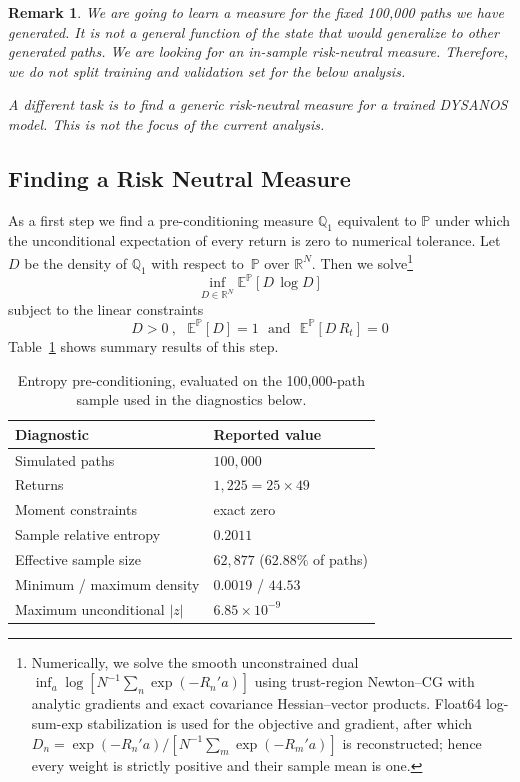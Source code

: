 \documentclass[11pt,a4paper]{article}
\newtheorem{remark}[definition]{Remark}
\newcommand{\R}{\mathbb{R}}
\newcommand{\E}{\mathbb{E}}
\newcommand{\Q}{\mathbb{Q}}
\renewcommand{\P}{\mathbb{P}}
\renewcommand{\Q}{\mathbb{Q}}
\DeclareRobustCommand{\eqlabel}[1]{\label{eq:#1}}                                     %
\DeclareRobustCommand{\eq}[1]{\begin{equation}\eqlabel{#1}}                           %
\DeclareRobustCommand{\eqend}{\end{equation}}                                         %
\begin{document}
\begin{remark}
We are going to learn a measure for the \emph{fixed} 100,000 paths we have generated. It is not a general function of the state that would
generalize to other generated paths. We are looking for an in-sample risk-neutral measure.
Therefore, we do not split training and validation set for the below analysis.

A different task is to find a generic risk-neutral measure for a trained DYSANOS model. This is not the focus of the current analysis.
\end{remark}

\subsection{Finding a Risk Neutral Measure}

As a first step we find a pre-conditioning measure $\Q_1$ equivalent to $\P$ under which the unconditional expectation of every return is zero to numerical tolerance.
Let $D$ be the density of $\Q_1$ with respect to~$\P$ over $\R^N$. Then we solve\footnote{
  Numerically, we solve the smooth unconstrained dual
  $\inf_a\log[N^{-1}\sum_n\exp(-R_n'a)]$ using trust-region Newton--CG with analytic gradients and exact covariance Hessian--vector products.
  Float64 log-sum-exp stabilization is used for the objective and gradient, after which $D_n=\exp(-R_n'a)/[N^{-1}\sum_m\exp(-R_m'a)]$ is reconstructed;
  hence every weight is strictly positive and their sample mean is one.}
\eq{convex}
  \inf_{D\in \R^N} \E^\P\left[ D\, \log D \right]
\eqend
subject to the linear constraints
\eq{convexcond}
  D > 0 \ , \ \ \ \E^\P\left[ D \right ] = 1 \ \ \ \mbox{and} \ \ \ \E^\P\left[ D\,R_t \right] = 0
\eqend
Table~\ref{tab:rn-precondition} shows summary results of this step.
\begin{table}[H]
  \centering
  \begin{tabular}{@{}ll@{}}
    \toprule
    Diagnostic & Reported value \\
    \midrule
    Simulated paths & $ 100{,}000$ \\
    Returns & $1{,}225=25\times49$ \\
    Moment constraints & exact zero \\
    Sample relative entropy & $0.2011$ \\
    Effective sample size & $62{,}877$ ($62.88\%$ of paths) \\
    Minimum / maximum density & $0.0019$ / $44.53$ \\
    Maximum unconditional $|z|$ & $6.85\times10^{-9}$ \\
    \bottomrule
  \end{tabular}
  \caption{Entropy pre-conditioning,
  evaluated on the 100,000-path sample used in the diagnostics below.}
  \label{tab:rn-precondition}
\end{table}
\end{document}
